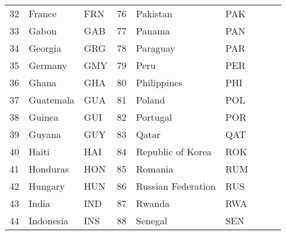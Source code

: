 \begin{table}[!htb]
{\begin{tabular}{@{}rllllllll@{}}
			32                               & France             & FRN          & 76           & Pakistan              & PAK                   &              &                          &                       \\
			33                               & Gabon              & GAB          & 77           & Panama                & PAN                   &              &                          &                       \\
			34                               & Georgia            & GRG          & 78           & Paraguay              & PAR                   &              &                          &                       \\
			35                               & Germany            & GMY          & 79           & Peru                  & PER                   &              &                          &                       \\
			36                               & Ghana              & GHA          & 80           & Philippines           & PHI                   &              &                          &                       \\
			37                               & Guatemala          & GUA          & 81           & Poland                & POL                   &              &                          &                       \\
			38                               & Guinea             & GUI          & 82           & Portugal              & POR                   &              &                          &                       \\
			39                               & Guyana             & GUY          & 83           & Qatar                 & QAT                   &              &                          &                       \\
			40                               & Haiti              & HAI          & 84           & Republic of Korea     & ROK                   &              &                          &                       \\
			41                               & Honduras           & HON          & 85           & Romania               & RUM                   &              &                          &                       \\
			42                               & Hungary            & HUN          & 86           & Russian Federation    & RUS                   &              &                          &                       \\
			43                               & India              & IND          & 87           & Rwanda                & RWA                   &              &                          &                       \\
			44                               & Indonesia          & INS          & 88           & Senegal               & SEN                   &              &                          &                       \\ \bottomrule
		\end{tabular}
}
\end{table}
